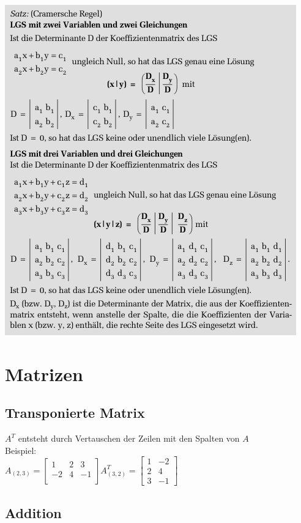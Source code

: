 \documentclass[a4paper,12pt]{scrartcl}
\begin{document}
\includegraphics{wim01-zusammenfassung_cramersche_regel.png}


\section{Matrizen}
\subsection{Transponierte Matrix}
$A^T$ entsteht durch Vertauschen der Zeilen mit den Spalten von $A$\\

Beispiel: \\
$A_{(2,3)} = 
\begin{bmatrix}
 1 & 2 & 3\\
 -2 & 4 & -1 \\
\end{bmatrix}
A_{(3,2)}^T = 
\begin{bmatrix}
 1 & -2\\
 2 & 4\\
 3 & -1
\end{bmatrix}
$
\subsection{Addition}
\end{document}
